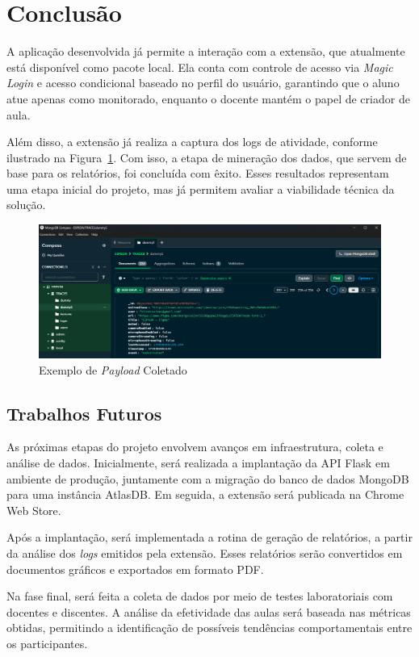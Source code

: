 \section{Conclusão}\label{sec:conclusion}
A aplicação desenvolvida já permite a interação com a extensão, que atualmente está disponível como pacote local. Ela conta com controle de acesso via \textit{Magic Login} e acesso condicional baseado no perfil do usuário, garantindo que o aluno atue apenas como monitorado, enquanto o docente mantém o papel de criador de aula.

Além disso, a extensão já realiza a captura dos logs de atividade, conforme ilustrado na Figura~\ref{fig:figura5}. Com isso, a etapa de mineração dos dados, que servem de base para os relatórios, foi concluída com êxito. Esses resultados representam uma etapa inicial do projeto, mas já permitem avaliar a viabilidade técnica da solução.

\FloatBarrier
\begin{figure}[H]
\centering
\includegraphics[width=.99\textwidth]{assets/images/resultadosv2.png}
\caption{Exemplo de \textit{Payload} Coletado}
\label{fig:figura5}
\end{figure}


\subsection{Trabalhos Futuros}\label{sub:future_endeavors}
As próximas etapas do projeto envolvem avanços em infraestrutura, coleta e análise de dados. Inicialmente, será realizada a implantação da API Flask em ambiente de produção, juntamente com a migração do banco de dados MongoDB para uma instância AtlasDB. Em seguida, a extensão será publicada na Chrome Web Store.

Após a implantação, será implementada a rotina de geração de relatórios, a partir da análise dos \textit{logs} emitidos pela extensão. Esses relatórios serão convertidos em documentos gráficos e exportados em formato PDF.

Na fase final, será feita a coleta de dados por meio de testes laboratoriais com docentes e discentes. A análise da efetividade das aulas será baseada nas métricas obtidas, permitindo a identificação de possíveis tendências comportamentais entre os participantes.


